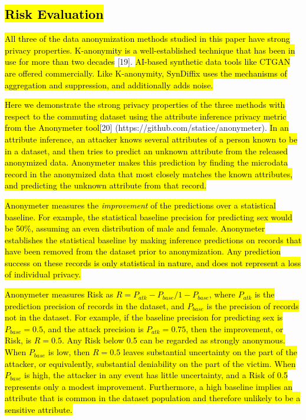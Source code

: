 \documentclass[10pt]{article}
\newcommand{\mycite}[1]{[#1]}
\begin{document}
\subsection*{\hl{Risk Evaluation}}

\hl{All three of the data anonymization methods studied in this paper have strong privacy properties. K-anonymity is a well-established technique that has been in use for more than two decades} \mycite{19}. \hl{AI-based synthetic data tools like CTGAN are offered commercially. Like K-anonymity, SynDiffix uses the mechanisms of aggregation and suppression, and additionally adds noise.}

\hl{Here we demonstrate the strong privacy properties of the three methods with respect to the commuting dataset using the attribute inference privacy metric from the Anonymeter tool}\mycite{20} (https://github.com/statice/anonymeter). \hl{In an attribute inference, an attacker knows several attributes of a person known to be in a dataset, and then tries to predict an unknown attribute from the released anonymized data. Anonymeter makes this prediction by finding the microdata record in the anonymized data that most closely matches the known attributes, and predicting the unknown attribute from that record.} 

\hl{Anonymeter measures the \textit{improvement} of the predictions over a statistical baseline. For example, the statistical baseline precision for predicting sex would be 50\%, assuming an even distribution of male and female. Anonymeter establishes the statistical baseline by making inference predictions on records that have been removed from the dataset prior to anonymization. Any prediction success on these records is only statistical in nature, and does not represent a loss of individual privacy.
}

\hl{Anonymeter measures Risk as $R=P_{atk}-P_{base}/1-P_{base}$, where $P_{atk}$ is the prediction precision of records in the dataset, and $P_{base}$ is the precision of records not in the dataset. For example, if the baseline precision for predicting sex is $P_{base}=0.5$, and the attack precision is $P_{atk}=0.75$, then the improvement, or Risk, is $R=0.5$. Any Risk below 0.5 can be regarded as strongly anonymous. When $P_{base}$ is low, then $R=0.5$ leaves substantial uncertainty on the part of the attacker, or equivalently, substantial deniability on the part of the victim. When $P_{base}$ is high, the attacker in any event has little uncertainty, and a Risk of 0.5 represents only a modest improvement. Furthermore, a high baseline implies an attribute that is common in the dataset population and therefore unlikely to be a sensitive attribute.}
\end{document}
